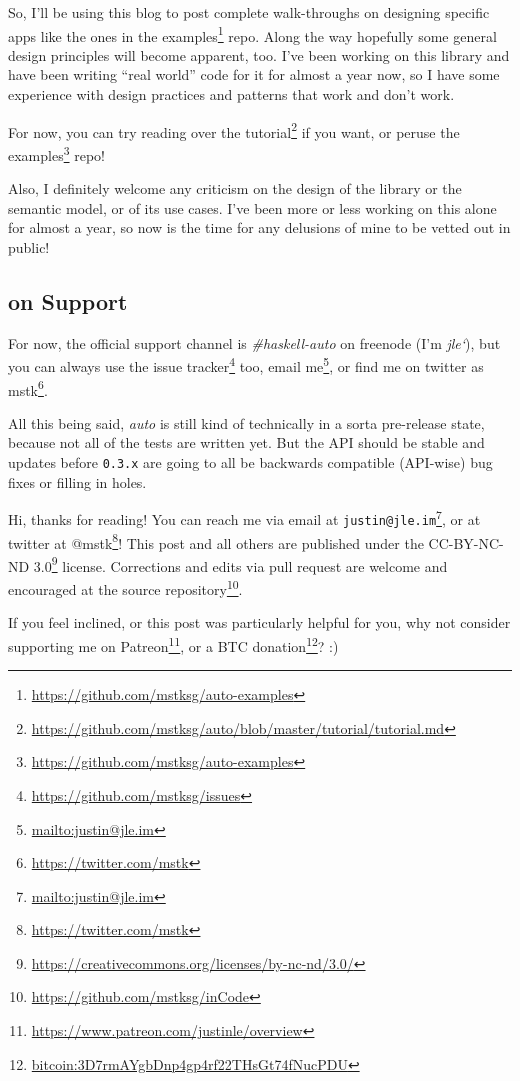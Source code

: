 \documentclass[]{article}
\renewcommand{\href}[2]{#2\footnote{\url{#1}}}
\begin{document}
So, I'll be using this blog to post complete walk-throughs on designing specific
apps like the ones in the
\href{https://github.com/mstksg/auto-examples}{examples} repo. Along the way
hopefully some general design principles will become apparent, too. I've been
working on this library and have been writing ``real world'' code for it for
almost a year now, so I have some experience with design practices and patterns
that work and don't work.

For now, you can try reading over the
\href{https://github.com/mstksg/auto/blob/master/tutorial/tutorial.md}{tutorial}
if you want, or peruse the
\href{https://github.com/mstksg/auto-examples}{examples} repo!

Also, I definitely welcome any criticism on the design of the library or the
semantic model, or of its use cases. I've been more or less working on this
alone for almost a year, so now is the time for any delusions of mine to be
vetted out in public!

\hypertarget{on-support}{%
\subsection{on Support}\label{on-support}}

For now, the official support channel is \emph{\#haskell-auto} on freenode (I'm
\emph{jle`}), but you can always use the
\href{https://github.com/mstksg/issues}{issue tracker} too,
\href{mailto:justin@jle.im}{email me}, or find me on twitter as
\href{https://twitter.com/mstk}{mstk}.

All this being said, \emph{auto} is still kind of technically in a sorta
pre-release state, because not all of the tests are written yet. But the API
should be stable and updates before \texttt{0.3.x} are going to all be backwards
compatible (API-wise) bug fixes or filling in holes.

Hi, thanks for reading! You can reach me via email at
\href{mailto:justin@jle.im}{\nolinkurl{justin@jle.im}}, or at twitter at
\href{https://twitter.com/mstk}{@mstk}! This post and all others are published
under the \href{https://creativecommons.org/licenses/by-nc-nd/3.0/}{CC-BY-NC-ND
3.0} license. Corrections and edits via pull request are welcome and encouraged
at \href{https://github.com/mstksg/inCode}{the source repository}.

If you feel inclined, or this post was particularly helpful for you, why not
consider \href{https://www.patreon.com/justinle/overview}{supporting me on
Patreon}, or a \href{bitcoin:3D7rmAYgbDnp4gp4rf22THsGt74fNucPDU}{BTC donation}?
:)
\end{document}
